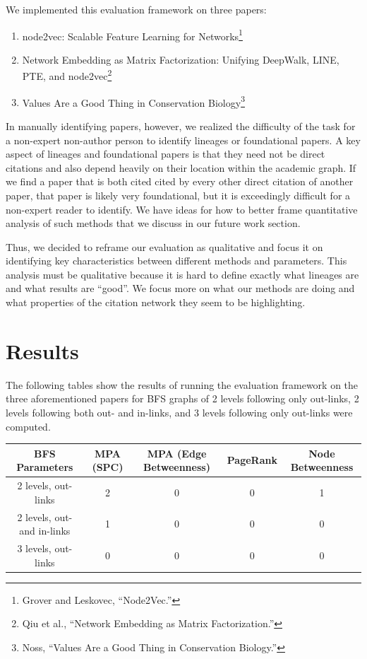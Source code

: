 \documentclass[lettepaper,]{article}
\providecommand{\tightlist}{%
  \setlength{\itemsep}{0pt}\setlength{\parskip}{0pt}}
\begin{document}
We implemented this evaluation framework on three papers:

\begin{enumerate}
\def\labelenumi{\arabic{enumi}.}
\tightlist
\item
  node2vec: Scalable Feature Learning for Networks\footnote{Grover and
    Leskovec, ``Node2Vec.''}
\item
  Network Embedding as Matrix Factorization: Unifying DeepWalk, LINE,
  PTE, and node2vec\footnote{Qiu et al., ``Network Embedding as Matrix
    Factorization.''}
\item
  Values Are a Good Thing in Conservation Biology\footnote{Noss,
    ``Values Are a Good Thing in Conservation Biology.''}
\end{enumerate}

In manually identifying papers, however, we realized the difficulty of
the task for a non-expert non-author person to identify lineages or
foundational papers. A key aspect of lineages and foundational papers is
that they need not be direct citations and also depend heavily on their
location within the academic graph. If we find a paper that is both
cited cited by every other direct citation of another paper, that paper
is likely very foundational, but it is exceedingly difficult for a
non-expert reader to identify. We have ideas for how to better frame
quantitative analysis of such methods that we discuss in our future work
section.

Thus, we decided to reframe our evaluation as qualitative and focus it
on identifying key characteristics between different methods and
parameters. This analysis must be qualitative because it is hard to
define exactly what lineages are and what results are ``good''. We focus
more on what our methods are doing and what properties of the citation
network they seem to be highlighting.

\hypertarget{results}{%
\section{Results}\label{results}}

The following tables show the results of running the evaluation
framework on the three aforementioned papers for BFS graphs of 2 levels
following only out-links, 2 levels following both out- and in-links, and
3 levels following only out-links were computed.

\begin{longtable}[]{@{}ccccc@{}}
\toprule
BFS Parameters & MPA (SPC) & MPA (Edge Betweenness) & PageRank & Node
Betweenness\tabularnewline
\midrule
\endhead
2 levels, out-links & 2 & 0 & 0 & 1\tabularnewline
2 levels, out- and in-links & 1 & 0 & 0 & 0\tabularnewline
3 levels, out-links & 0 & 0 & 0 & 0\tabularnewline
\bottomrule
\end{longtable}
\end{document}
